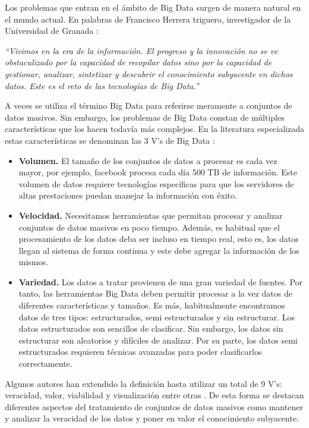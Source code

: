 \documentclass[10pt]{article}
\begin{document}
	Los problemas que entran en el ámbito de Big Data surgen de manera natural en el mundo actual. En palabras de Francisco Herrera triguero, investigador de la Universidad de Granada  \cite{big-data-herrera}:
	
	\textit{``Vivimos en la era de la información. El progreso y la innovación no se ve obstaculizado por la capacidad de recopilar datos sino por la capacidad de gestionar, analizar, sintetizar y descubrir el conocimiento subyacente en dichos datos. Este es el reto de las tecnologías de Big Data.''}
	
	A veces se utiliza el término Big Data para referirse meramente a conjuntos de datos masivos. Sin embargo, los problemas de Big Data constan de múltiples características que los hacen todavía más complejos. En la literatura especializada estas características se denominan las 3 V's de Big Data \cite{big-data}:

	\begin{itemize}
		\item \textbf{Volumen.} El tamaño de los conjuntos de datos a procesar es cada vez mayor, por ejemplo, facebook procesa cada día 500 TB de información. Este volumen de datos requiere tecnologías específicas para que los servidores de altas prestaciones puedan manejar la información con éxito.
		\item \textbf{Velocidad.} Necesitamos herramientas que permitan procesar y analizar conjuntos de datos masivos en poco tiempo. Además, es habitual que el procesamiento de los datos deba ser incluso en tiempo real, esto es, los datos llegan al sistema de forma continua y este debe agregar la información de los mismos.
		\item \textbf{Variedad.} Los datos a tratar provienen de una gran variedad de fuentes. Por tanto, las herramientas Big Data deben permitir procesar a la vez datos de diferentes características y tamaños. Es más, habitualmente encontramos datos de tres tipos: estructurados, semi estructurados y sin estructurar. Los datos estructurados son sencillos de clasificar. Sin embargo, los datos sin estructurar son aleatorios y difíciles de analizar. Por su parte, los datos semi estructurados requieren técnicas avanzadas para poder clasificarlos correctamente.
	\end{itemize}

	Algunos autores han extendido la definición hasta utilizar un total de 9 V's: veracidad, valor, viabilidad y visualización entre otras \cite{understanding-big-data}. De esta forma se destacan diferentes aspectos del tratamiento de conjuntos de datos masivos como mantener y analizar la veracidad de los datos y poner en valor el conocimiento subyacente.
\end{document}
